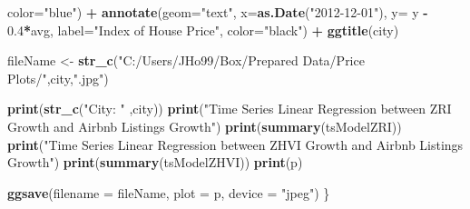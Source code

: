 \documentclass[
]{article}
\newenvironment{Shaded}{\begin{snugshade}}{\end{snugshade}}
\newcommand{\DataTypeTok}[1]{\textcolor[rgb]{0.13,0.29,0.53}{#1}}
\newcommand{\FloatTok}[1]{\textcolor[rgb]{0.00,0.00,0.81}{#1}}
\newcommand{\KeywordTok}[1]{\textcolor[rgb]{0.13,0.29,0.53}{\textbf{#1}}}
\newcommand{\NormalTok}[1]{#1}
\newcommand{\OperatorTok}[1]{\textcolor[rgb]{0.81,0.36,0.00}{\textbf{#1}}}
\newcommand{\StringTok}[1]{\textcolor[rgb]{0.31,0.60,0.02}{#1}}
\begin{document}
\begin{Shaded}
\begin{Highlighting}[]
             \DataTypeTok{color=}\StringTok{"blue"}\NormalTok{) }\OperatorTok{+}
\StringTok{    }\KeywordTok{annotate}\NormalTok{(}\DataTypeTok{geom=}\StringTok{"text"}\NormalTok{, }\DataTypeTok{x=}\KeywordTok{as.Date}\NormalTok{(}\StringTok{"2012-12-01"}\NormalTok{), }\DataTypeTok{y=}\NormalTok{ y }\OperatorTok{-}\StringTok{ }\FloatTok{0.4}\OperatorTok{*}\NormalTok{avg, }\DataTypeTok{label=}\StringTok{"Index of House Price"}\NormalTok{,}
             \DataTypeTok{color=}\StringTok{"black"}\NormalTok{) }\OperatorTok{+}
\StringTok{    }\KeywordTok{ggtitle}\NormalTok{(city)}
  
\NormalTok{  fileName <-}\StringTok{ }\KeywordTok{str_c}\NormalTok{(}\StringTok{"C:/Users/JHo99/Box/Prepared Data/Price Plots/"}\NormalTok{,city,}\StringTok{".jpg"}\NormalTok{)}
  
  \KeywordTok{print}\NormalTok{(}\KeywordTok{str_c}\NormalTok{(}\StringTok{"City: "}\NormalTok{ ,city))}
  \KeywordTok{print}\NormalTok{(}\StringTok{"Time Series Linear Regression between ZRI Growth and Airbnb Listings Growth"}\NormalTok{)}
  \KeywordTok{print}\NormalTok{(}\KeywordTok{summary}\NormalTok{(tsModelZRI))}
  \KeywordTok{print}\NormalTok{(}\StringTok{"Time Series Linear Regression between ZHVI Growth and Airbnb Listings Growth"}\NormalTok{)}
  \KeywordTok{print}\NormalTok{(}\KeywordTok{summary}\NormalTok{(tsModelZHVI))}
  \KeywordTok{print}\NormalTok{(p)}
  
  \KeywordTok{ggsave}\NormalTok{(}\DataTypeTok{filename =}\NormalTok{ fileName, }\DataTypeTok{plot =}\NormalTok{ p, }\DataTypeTok{device =} \StringTok{"jpeg"}\NormalTok{)}
\NormalTok{\}}
\end{Highlighting}
\end{Shaded}
\end{document}
